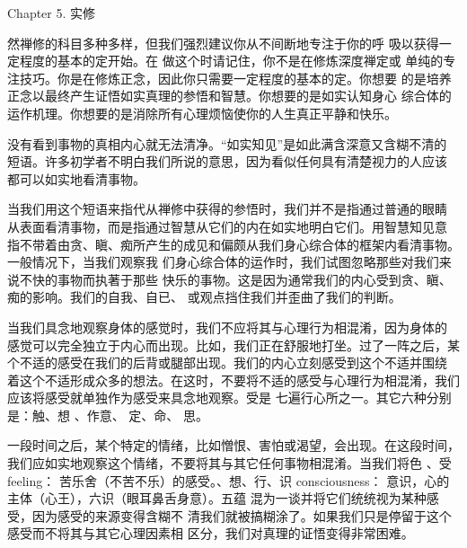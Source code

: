 


\beginchapter Chapter 5. 实修


{
\parindent=3pc
\noindent\hang{}
\1%
{然禅修的科目多种多样}，但我们强烈建议你从不间断地专注于你的呼
吸以获得一定程度的基本的定开始。在
做这个时请记住，你不是在修炼深度禅定或
单纯的专注技巧。你是在修炼正念，因此你只需要一定程度的基本的定。你想要
的是培养正念以最终产生证悟如实真理的参悟和智慧。你想要的是如实认知身心
综合体的运作机理。你想要的是消除所有心理烦恼使你的人生真正平静和快乐。

}

没有看到事物的真相内心就无法清净。“如实知见”是如此满含深意又含糊不清的
短语。许多初学者不明白我们所说的意思，因为看似任何具有清楚视力的人应该
都可以如实地看清事物。

当我们用这个短语来指代从禅修中获得的参悟时，我们并不是指通过普通的眼睛
从表面看清事物，而是指通过智慧从它们的内在如实地明白它们。用智慧知见意
指不带着由贪、瞋、痴所产生的成见和偏颇从我们身心综合体的框架内看清事物。一般情况下，当我们观察我
们\1身心综合体的运作时，我们试图忽略那些对我们来说不快的事物而执著于那些
快乐的事物。这是因为通常我们的内心受到贪、瞋、痴的影响。我们的自我、自已、
或观点挡住我们并歪曲了我们的判断。

当我们具念地观察身体的感觉时，我们不应将其与心理行为相混淆，因为身体的
感觉可以完全独立于内心而出现。比如，我们正在舒服地打坐。过了一阵之后，某
个不适的感受在我们的后背或腿部出现。我们的内心立刻感受到这个不适并围绕
着这个不适形成众多的想法。在这时，不要将不适的感受与心理行为相混淆，我们
应该将感受就单独作为感受来具念地观察。受是
七遍行心所之一。其它六种分别是：触、想
、作意、
定、命、
思。

一段时间之后，某个特定的情绪，比如憎恨、害怕或渴望，会出现。在这段时间，
我们应如实地观察这个情绪，不要将其与其它任何事物相混淆。当我们将色
、受\myfootnote%
{feeling： 苦乐舍（不苦不乐）的感受。}、想、行、识\myfootnote%
{consciousness： 意识，心的主体（心王），六识（眼耳鼻舌身意）。}五蕴
混为一谈并将它们统统视为某种感受，因为感受的来源变得含糊不
清我们就被搞糊涂了。如果我们只是停留于这个感受而不将其与其它心理因素相
区分，我们对真理的证悟变得非常困难。

